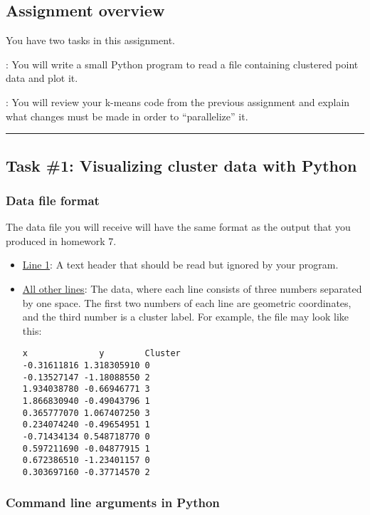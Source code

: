 \subsection*{Assignment overview}
\noindent You have two tasks in this assignment.

    \vspace{8pt}: You will write a small Python program to read a file containing clustered point data and plot it.

\vspace{4pt}: You will review your k-means code from the previous assignment and explain what changes must be made in order to ``parallelize'' it.

\vspace{8pt}\hrule 

\subsection*{Task \#1: Visualizing cluster data with Python}

\subsubsection*{Data file format}

The data file you will receive will have the same format as the output that you produced in homework 7.
\begin{itemize}
    \item \underline{Line 1}: A text header that should be read but ignored by your program.
    \item \underline{All other lines}: The data, where each line consists of three numbers separated by one space.
    The first two numbers of each line are geometric coordinates, and the third number is a cluster label.
    For example, the file may look like this:
    \begin{verbatim}
x              y        Cluster
-0.31611816 1.318305910 0
-0.13527147 -1.18088550 2
1.934038780 -0.66946771 3
1.866830940 -0.49043796 1
0.365777070 1.067407250 3
0.234074240 -0.49654951 1
-0.71434134 0.548718770 0
0.597211690 -0.04877915 1
0.672386510 -1.23401157 0
0.303697160 -0.37714570 2
    \end{verbatim}
\end{itemize}

\subsubsection*{Command line arguments in Python}

